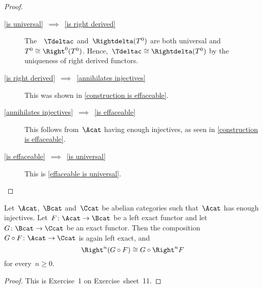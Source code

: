 \begin{proof}
  \leavevmode
  \begin{description}
    \item[\ref*{is universal}~$\implies$~\ref*{is right derived}]
      The~{\deltafuns}~$\Tdeltac$ and~$\Rightdelta (T^0)$ are both universal and~$T^0 \cong \Right^0 (T^0)$.
      Hence,~$\Tdeltac \cong \Rightdelta (T^0)$ by the uniqueness of right derived functors.
    \item[\ref*{is right derived}~$\implies$~\ref*{annihilates injectives}]
      This was shown in \cref{construction is effaceable}.
    \item[\ref*{annihilates injectives}~$\implies$~\ref*{is effaceable}]
      This follows from~$\Acat$ having enough injectives, as seen in \cref{construction is effaceable}.
    \item[\ref*{is effaceable}~$\implies$~\ref*{is universal}]
      This is \cref{effaceable is universal}.
    \qedhere
  \end{description}
\end{proof}


\begin{lemma*}
  \label{exact functors respect derived}
  Let~$\Acat$,~$\Bcat$ and~$\Ccat$ be abelian categories such that~$\Acat$ has enough injectives.
  Let~$F \colon \Acat \to \Bcat$ be a left exact functor and let~$G \colon \Bcat \to \Ccat$ be an exact functor.
  Then the composition~$G \circ F \colon \Acat \to \Ccat$ is again left exact, and
  \[
    \Right^n (G \circ F)
    \cong
    G \circ \Right^n F
  \]
  for every~$n \geq 0$.
\end{lemma*}


\begin{proof}
  This is Exercise~1 on Exercise~sheet~11.
\end{proof}










